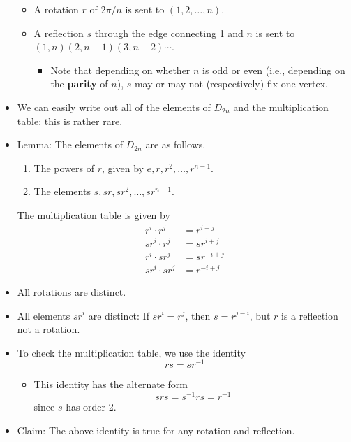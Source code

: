 \documentclass[../notes.tex]{subfiles}
\begin{document}
\begin{itemize}
    \begin{itemize}
        \item A rotation $r$ of $2\pi/n$ is sent to $(1,2,\dots,n)$.
        \item A reflection $s$ through the edge connecting 1 and $n$ is sent to $(1,n)(2,n-1)(3,n-2)\cdots$.
        \begin{itemize}
            \item Note that depending on whether $n$ is odd or even (i.e., depending on the \textbf{parity} of $n$), $s$ may or may not (respectively) fix one vertex.
        \end{itemize}
    \end{itemize}
    \item We can easily write out all of the elements of $D_{2n}$ and the multiplication table; this is rather rare.
    \item Lemma: The elements of $D_{2n}$ are as follows.
    \begin{enumerate}
        \item The powers of $r$, given by $e,r,r^2,\dots,r^{n-1}$.
        \item The elements $s,sr,sr^2,\dots,sr^{n-1}$.
    \end{enumerate}
    The multiplication table is given by
    \begin{align*}
        r^i\cdot r^j &= r^{i+j}\\
        sr^i\cdot r^j &= sr^{i+j}\\
        r^i\cdot sr^j &= sr^{-i+j}\\
        sr^i\cdot sr^j &= r^{-i+j}
    \end{align*}
    \item All rotations are distinct.
    \item All elements $sr^i$ are distinct: If $sr^i=r^j$, then $s=r^{j-i}$, but $r$ is a reflection not a rotation.
    \item To check the multiplication table, we use the identity
    \begin{equation*}
        rs = sr^{-1}
    \end{equation*}
    \begin{itemize}
        \item This identity has the alternate form
        \begin{equation*}
            srs = s^{-1}rs = r^{-1}
        \end{equation*}
        since $s$ has order 2.
    \end{itemize}
    \item Claim: The above identity is true for any rotation and reflection.
    \begin{figure}[H]
        \centering
        \footnotesize
        \begin{subfigure}[b]{0.3\linewidth}
            \centering
\end{subfigure}
\end{figure}
\end{itemize}
\end{document}
